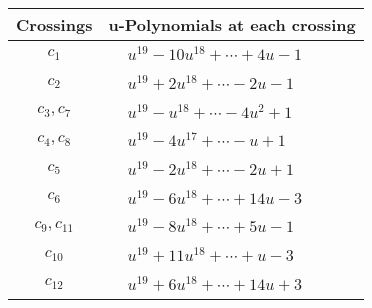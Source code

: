 \documentclass[1p]{elsarticle_modified}
\theoremstyle{definition}
\begin{document}
\begin{tabular}{m{50pt}|m{274pt}}
Crossings & \hspace{64pt}u-Polynomials at each crossing \\
\hline $$\begin{aligned}c_{1}\end{aligned}$$&$\begin{aligned}
&u^{19}-10 u^{18}+\cdots+4 u-1
\end{aligned}$\\
\hline $$\begin{aligned}c_{2}\end{aligned}$$&$\begin{aligned}
&u^{19}+2 u^{18}+\cdots-2 u-1
\end{aligned}$\\
\hline $$\begin{aligned}c_{3},c_{7}\end{aligned}$$&$\begin{aligned}
&u^{19}- u^{18}+\cdots-4 u^2+1
\end{aligned}$\\
\hline $$\begin{aligned}c_{4},c_{8}\end{aligned}$$&$\begin{aligned}
&u^{19}-4 u^{17}+\cdots- u+1
\end{aligned}$\\
\hline $$\begin{aligned}c_{5}\end{aligned}$$&$\begin{aligned}
&u^{19}-2 u^{18}+\cdots-2 u+1
\end{aligned}$\\
\hline $$\begin{aligned}c_{6}\end{aligned}$$&$\begin{aligned}
&u^{19}-6 u^{18}+\cdots+14 u-3
\end{aligned}$\\
\hline $$\begin{aligned}c_{9},c_{11}\end{aligned}$$&$\begin{aligned}
&u^{19}-8 u^{18}+\cdots+5 u-1
\end{aligned}$\\
\hline $$\begin{aligned}c_{10}\end{aligned}$$&$\begin{aligned}
&u^{19}+11 u^{18}+\cdots+u-3
\end{aligned}$\\
\hline $$\begin{aligned}c_{12}\end{aligned}$$&$\begin{aligned}
&u^{19}+6 u^{18}+\cdots+14 u+3
\end{aligned}$\\
\hline
\end{tabular}\\~\\
\end{document}

